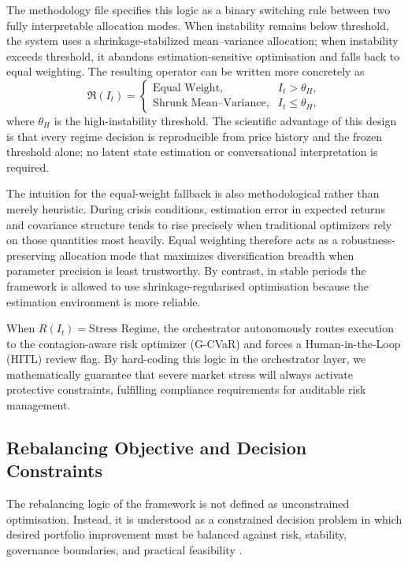\documentclass[11pt]{article}
\begin{document}
The methodology file specifies this logic as a binary switching rule between two fully interpretable allocation modes. When instability remains below threshold, the system uses a shrinkage-stabilized mean--variance allocation; when instability exceeds threshold, it abandons estimation-sensitive optimisation and falls back to equal weighting. The resulting operator can be written more concretely as
\begin{equation}
\label{eq:binary-operator-expanded}
\Re(I_t) =
\begin{cases}
\text{Equal Weight}, & I_t > \theta_H,\\
\text{Shrunk Mean--Variance}, & I_t \le \theta_H,
\end{cases}
\end{equation}
where $\theta_H$ is the high-instability threshold. The scientific advantage of this design is that every regime decision is reproducible from price history and the frozen threshold alone; no latent state estimation or conversational interpretation is required.

The intuition for the equal-weight fallback is also methodological rather than merely heuristic. During crisis conditions, estimation error in expected returns and covariance structure tends to rise precisely when traditional optimizers rely on those quantities most heavily. Equal weighting therefore acts as a robustness-preserving allocation mode that maximizes diversification breadth when parameter precision is least trustworthy. By contrast, in stable periods the framework is allowed to use shrinkage-regularised optimisation because the estimation environment is more reliable.

When $R(I_t) = \text{Stress Regime}$, the orchestrator autonomously routes execution to the contagion-aware risk optimizer (G-CVaR) and forces a Human-in-the-Loop (HITL) review flag. By hard-coding this logic in the orchestrator layer, we mathematically guarantee that severe market stress will always activate protective constraints, fulfilling compliance requirements for auditable risk management.

\subsection{Rebalancing Objective and Decision Constraints}
The rebalancing logic of the framework is not defined as unconstrained optimisation. Instead, it is understood as a constrained decision problem in which desired portfolio improvement must be balanced against risk, stability, governance boundaries, and practical feasibility \cite{markowitz1952,jagannathan2003,lopez2016}.
\end{document}
